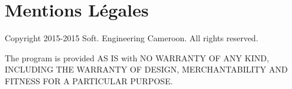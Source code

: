 \chapter{Mentions L\'egales}\label{chap:mentions-legales}

Copyright 2015-2015 Soft. Engineering Cameroon. All rights reserved.

The program is provided AS IS with NO WARRANTY OF ANY KIND,
INCLUDING THE WARRANTY OF DESIGN, MERCHANTABILITY AND FITNESS 
FOR A PARTICULAR PURPOSE.